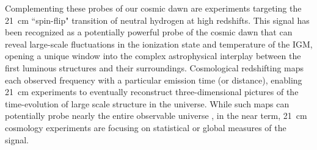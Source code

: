 \documentclass[twocolumn,numberedappendix]{emulateapj} \shorttitle{PSA64}
\begin{document}
Complementing these probes of our cosmic dawn are experiments targeting
the 21~cm ``spin-flip" transition of neutral hydrogen at high redshifts.
This signal has been recognized as a potentially powerful probe
of the cosmic dawn \citep{pritchard_loeb2012,morales_wyithe2010,furlanetto_et_al2006} that can reveal
large-scale fluctuations in the ionization state and temperature of the IGM, opening
a unique window into the complex astrophysical interplay between the first luminous
structures and their surroundings.
Cosmological redshifting maps 
each observed frequency with a particular emission time (or distance), enabling 21~cm experiments 
to eventually reconstruct 
three-dimensional pictures of the time-evolution of large scale structure in the universe. 
While such maps can potentially probe nearly the entire observable universe \citep{mao_et_al2008},
in the near term, 21~cm cosmology experiments are focusing on statistical or global measures
of the signal.

\end{document}
